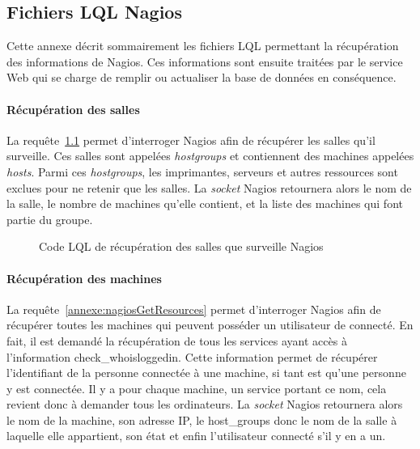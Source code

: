\begin{appendices}

\chapter{Fichiers LQL Nagios}
\label{chapterAnnexe:fichiersLQLNagios}

Cette annexe d\'ecrit sommairement les fichiers LQL permettant la r\'ecup\'eration des informations de Nagios. 
Ces informations sont ensuite trait\'ees par le service Web qui se charge de remplir ou actualiser la base de donn\'ees en cons\'equence.

\subsubsection{R\'ecup\'eration des salles}

La requ\^ete~\ref{annexe:nagiosGetHostGroups} permet d'interroger Nagios afin de r\'ecup\'erer les salles qu'il surveille.
Ces salles sont appel\'ees \textit{hostgroups} et contiennent des machines appel\'ees \textit{hosts}.
Parmi ces \textit{hostgroups}, les imprimantes, serveurs et autres ressources sont exclues pour ne retenir que les salles.
La \textit{socket} Nagios retournera alors le nom de la salle, le nombre de machines qu'elle contient, et la liste des machines qui font partie du groupe.

\vspace{0.20cm}

\begin{figure}[!ht]
	
	\caption{Code LQL de r\'ecup\'eration des salles que surveille Nagios}
	\label{annexe:nagiosGetHostGroups}

\end{figure}

\subsubsection{R\'ecup\'eration des machines}

La requ\^ete~\ref{annexe:nagiosGetResources} permet d'interroger Nagios afin de r\'ecup\'erer toutes les machines qui peuvent poss\'eder un utilisateur de connect\'e.
En fait, il est demand\'e la r\'ecup\'eration de tous les services ayant acc\`es \`a l'information \textsf{check\_whoisloggedin}.
Cette information permet de r\'ecup\'erer l'identifiant de la personne connect\'ee \`a une machine, si tant est qu'une personne y est connect\'ee.
Il y a pour chaque machine, un service portant ce nom, cela revient donc \`a demander tous les ordinateurs.
La \textit{socket} Nagios retournera alors le nom de la machine, son adresse IP, le \textsf{host\_groups} donc le nom de la salle \`a laquelle elle appartient, son \'etat et enfin l'utilisateur connect\'e s'il y en a un.


\end{appendices}
